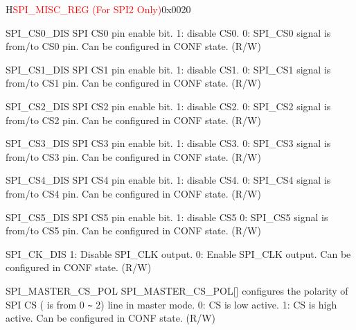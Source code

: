 \begin{register}{H}{\textcolor{red}{SPI\_MISC\_REG (For SPI2 Only)}}{0x{}0020}\label{regdesc:SPIMISCREG}
%
%
%
%
%
%
%
%
%
%
%
%
%
%
%
%
%
%
%
%
\regnewline%
\begin{regdesc}\begin{reglist}
\label{fielddesc:SPICS0DIS}\item [SPI\_CS0\_DIS] SPI CS0 pin enable bit. 1: disable CS0. 0: SPI\_CS0 signal is from/to CS0 pin. Can be configured in CONF state. (R/W)
\label{fielddesc:SPICS1DIS}\item [SPI\_CS1\_DIS] SPI CS1 pin enable bit. 1: disable CS1. 0: SPI\_CS1 signal is from/to CS1 pin. Can be configured in CONF state. (R/W)
\label{fielddesc:SPICS2DIS}\item [SPI\_CS2\_DIS] SPI CS2 pin enable bit. 1: disable CS2. 0: SPI\_CS2 signal is from/to CS2 pin. Can be configured in CONF state. (R/W)
\label{fielddesc:SPICS3DIS}\item [SPI\_CS3\_DIS] SPI CS3 pin enable bit. 1: disable CS3. 0: SPI\_CS3 signal is from/to CS3 pin. Can be configured in CONF state. (R/W)
\label{fielddesc:SPICS4DIS}\item [SPI\_CS4\_DIS] SPI CS4 pin enable bit. 1: disable CS4. 0: SPI\_CS4 signal is from/to CS4 pin. Can be configured in CONF state. (R/W)
\label{fielddesc:SPICS5DIS}\item [SPI\_CS5\_DIS] SPI CS5 pin enable bit. 1: disable CS5 0: SPI\_CS5 signal is from/to CS5 pin. Can be configured in CONF state. (R/W)
\label{fielddesc:SPICKDIS}\item [SPI\_CK\_DIS] 1: Disable SPI\_CLK output. 0: Enable SPI\_CLK output. Can be configured in CONF state. (R/W)
\label{fielddesc:SPIMASTERCSPOL}\item [SPI\_MASTER\_CS\_POL] SPI\_MASTER\_CS\_POL[] configures the polarity of SPI CS ( is from 0 \verb+~+ 2) line in master mode.
0: CS is low active. 1: CS is high active. Can be configured in CONF state. (R/W)


\end{reglist}
\end{regdesc}
\end{register}
